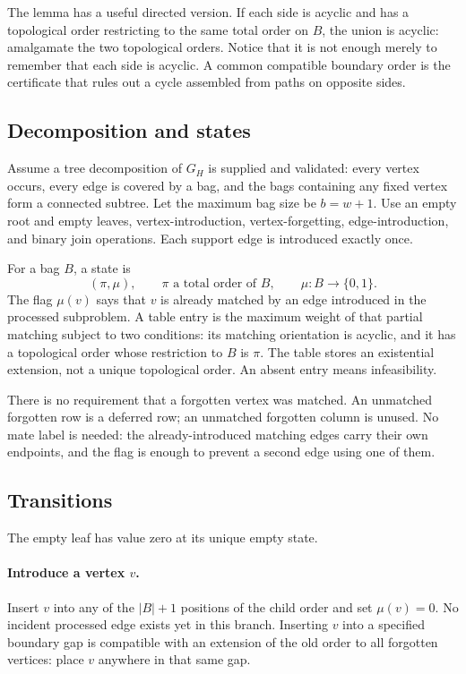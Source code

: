 \documentclass[11pt,a4paper]{article}
\theoremstyle{definition}
\theoremstyle{remark}
\begin{document}
The lemma has a useful directed version. If each side is acyclic and has
a topological order restricting to the same total order on $B$, the union
is acyclic: amalgamate the two topological orders. Notice that it is not
enough merely to remember that each side is acyclic. A common compatible
boundary order is the certificate that rules out a cycle assembled from
paths on opposite sides.

\subsection{Decomposition and states}
Assume a tree decomposition of $G_H$ is supplied and validated: every
vertex occurs, every edge is covered by a bag, and the bags containing
any fixed vertex form a connected subtree. Let the maximum bag size be
$b=w+1$. Use an empty root and empty leaves, vertex-introduction,
vertex-forgetting, edge-introduction, and binary join operations. Each
support edge is introduced exactly once.

For a bag $B$, a state is
\begin{equation}
 (\pi,\mu),\qquad
 \pi\text{ a total order of }B,\qquad \mu:B\to\{0,1\}.
 \label{eq:state}
\end{equation}
The flag $\mu(v)$ says that $v$ is already matched by an edge introduced
in the processed subproblem. A table entry is the maximum weight of that
partial matching subject to two conditions: its matching orientation is
acyclic, and it has a topological order whose restriction to $B$ is $\pi$.
The table stores an existential extension, not a unique topological order.
An absent entry means infeasibility.

There is no requirement that a forgotten vertex was matched. An unmatched
forgotten row is a deferred row; an unmatched forgotten column is unused.
No mate label is needed: the already-introduced matching edges carry their
own endpoints, and the flag is enough to prevent a second edge using one
of them.

\subsection{Transitions}
The empty leaf has value zero at its unique empty state.

\paragraph{Introduce a vertex $v$.}
Insert $v$ into any of the $|B|+1$ positions of the child order and set
$\mu(v)=0$. No incident processed edge exists yet in this branch. Inserting
$v$ into a specified boundary gap is compatible with an extension of the
old order to all forgotten vertices: place $v$ anywhere in that same gap.
\end{document}
